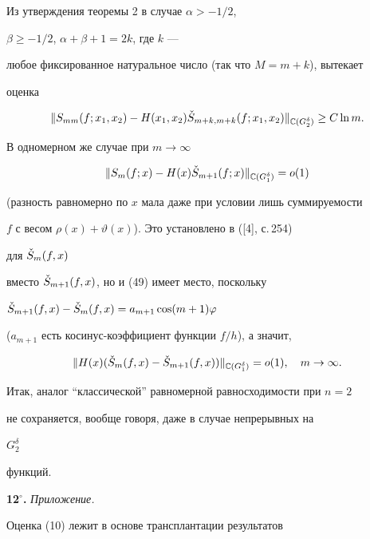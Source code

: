  


Из утверждения теоремы 2 в случае $\alpha>-1/2$, 


$\beta\ge-1/2$, $\alpha+\beta+1=2k$, где $k$ ---


любое фиксированное натуральное число (так что $M=m+k$), вытекает 


оценка 


$$ 


\|S_{mm}(f;x_1,x_2)-H(x_1,x_2) 


\Check S_{m+k,m+k}(f;x_1,x_2)\|_{\Bbb C(G^\delta_2)}\ge C\ln m. 


$$ 


В одномерном же случае при $m\to\infty$ 


\begin{equation} 


\|S_m(f;x)-H(x)\Check S_{m+1}(f;x)\|_{\Bbb C(G^\delta_1)}=o(1) 


\end{equation} 


(разность равномерно по $x$ мала даже при условии лишь суммируемости 


$f$ с весом $\rho(x)+\vartheta(x)$). Это установлено в ([4], с.\,254) 


для $\Check S_m(f,x)$ 


вместо $\Check S_{m+1}(f,x)$, но и (49) имеет место, поскольку 


$\Check S_{m+1}(f,x)-\Check S_m(f,x)=a_{m+1}\cos(m+1)\varphi$ 


($a_{m+1}$ есть косинус-коэффициент функции $f/h$), а значит, 


$$ 


\|H(x)(\Check S_m(f,x)-\Check S_{m+1}(f,x)) 


\|_{\Bbb C(G^\delta_1)}=o(1),\quad m\to\infty. 


$$ 


 


Итак, аналог ``классической'' равномерной равносходимости при $n=2$ 


не сохраняется, вообще говоря, даже в случае непрерывных на 


$G^\delta_2$ 


функций. 


\medskip 


 


 


{\bf 12${}^\circ$.} {\it Приложение.} 


Оценка (10) лежит в основе трансплантации результатов 


